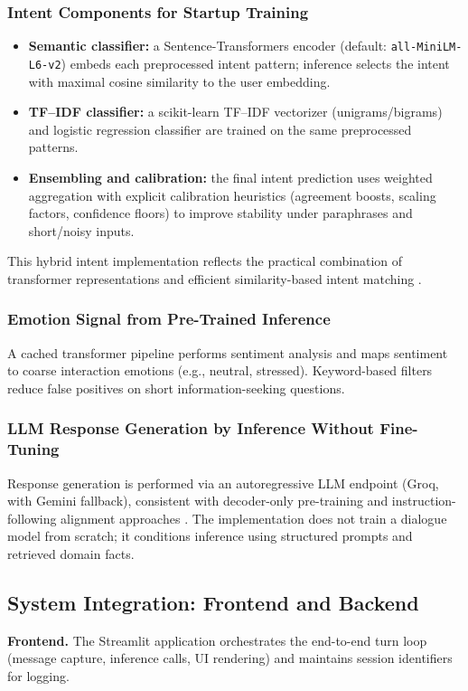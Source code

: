 \documentclass[12pt,onecolumn]{report}
\begin{document}
\subsubsection{Intent Components for Startup Training}
\begin{itemize}
	\item \textbf{Semantic classifier:} a Sentence-Transformers encoder (default: \texttt{all-MiniLM-L6-v2}) embeds each preprocessed intent pattern; inference selects the intent with maximal cosine similarity to the user embedding.
	\item \textbf{TF--IDF classifier:} a scikit-learn TF--IDF vectorizer (unigrams/bigrams) and logistic regression classifier are trained on the same preprocessed patterns.
	\item \textbf{Ensembling and calibration:} the final intent prediction uses weighted aggregation with explicit calibration heuristics (agreement boosts, scaling factors, confidence floors) to improve stability under paraphrases and short/noisy inputs.
\end{itemize}
This hybrid intent implementation reflects the practical combination of transformer representations \cite{vaswani2017attention,devlin2019bert,liu2019roberta} and efficient similarity-based intent matching \cite{casanueva2020banking77}.

\subsubsection{Emotion Signal from Pre-Trained Inference}
A cached transformer pipeline performs sentiment analysis and maps sentiment to coarse interaction emotions (e.g., neutral, stressed). Keyword-based filters reduce false positives on short information-seeking questions.

\subsubsection{LLM Response Generation by Inference Without Fine-Tuning}
Response generation is performed via an autoregressive LLM endpoint (Groq, with Gemini fallback), consistent with decoder-only pre-training and instruction-following alignment approaches \cite{radford2019gpt2,ouyang2022rlhf,openai2022chatgpt}. The implementation does not train a dialogue model from scratch; it conditions inference using structured prompts and retrieved domain facts.

\subsection{System Integration: Frontend and Backend}
\textbf{Frontend.} The Streamlit application orchestrates the end-to-end turn loop (message capture, inference calls, UI rendering) and maintains session identifiers for logging.
\end{document}
